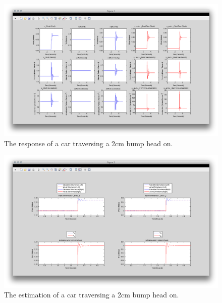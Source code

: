 \begin{figure}[t]
	\centering
	\includegraphics[width=1.0\textwidth]{figures/fullcar_2cm.png}
	\caption{The response of a car traversing a 2cm bump head on.}
	\label{fig:fullcar_2cm}
\end{figure}

\begin{figure}[t]
	\centering
	\includegraphics[width=1.0\textwidth]{figures/fullcar_inverse_2cm.png}
	\caption{The estimation of a car traversing a 2cm bump head on.}
	\label{fig:fullcar_2cm}
\end{figure}

